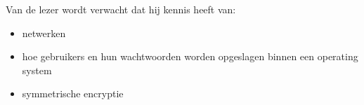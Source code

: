 Van de lezer wordt verwacht dat hij kennis heeft van:
\begin{itemize}
\item netwerken
\item hoe gebruikers en hun wachtwoorden worden opgeslagen binnen een operating system
\item symmetrische encryptie
\end{itemize}

